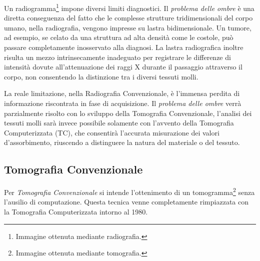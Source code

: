 \documentclass[a4paper,12pt, doubleside]{report}
\begin{document}
                \bigskip 
                \par
                    Un radiogramma\footnote{Immagine ottenuta mediante radiografia.} impone diversi limiti diagnostici. Il \textit{problema delle ombre} è una diretta conseguenza del fatto che le complesse strutture tridimensionali del corpo umano, nella radiografia, vengono impresse su lastra bidimensionale. Un tumore, ad esempio, se celato da una struttura ad alta densità come le costole, può passare completamente inosservato alla diagnosi. La lastra radiografica inoltre risulta un mezzo intrinsecamente inadeguato per registrare le differenze di intensità dovute all'attenuazione dei raggi X durante il passaggio attraverso il corpo, non consentendo la distinzione tra i diversi tessuti molli.
                
                \bigskip            
                \par
                    La reale limitazione, nella Radiografia Convenzionale, è l'immensa perdita di informazione riscontrata in fase di acquisizione. Il \textit{problema delle ombre} verrà parzialmente risolto con lo sviluppo della Tomografia Convenzionale, l'analisi dei tessuti molli sarà invece possibile solamente con l'avvento della Tomografia Computerizzata (TC), che consentirà l'accurata misurazione dei valori d'assorbimento, riuscendo a distinguere la natura del materiale o del tessuto.
                            
            \subsection{Tomografia Convenzionale}
            \label{sub:TomografiaConvenzionale}
                \par
                    Per \textit{Tomografia Convenzionale} si intende l'ottenimento di un tomogramma\footnote{Immagine ottenuta mediante tomografia.} senza l'ausilio di computazione. Questa tecnica venne completamente rimpiazzata con la Tomografia Computerizzata intorno al 1980.
                
\end{document}
